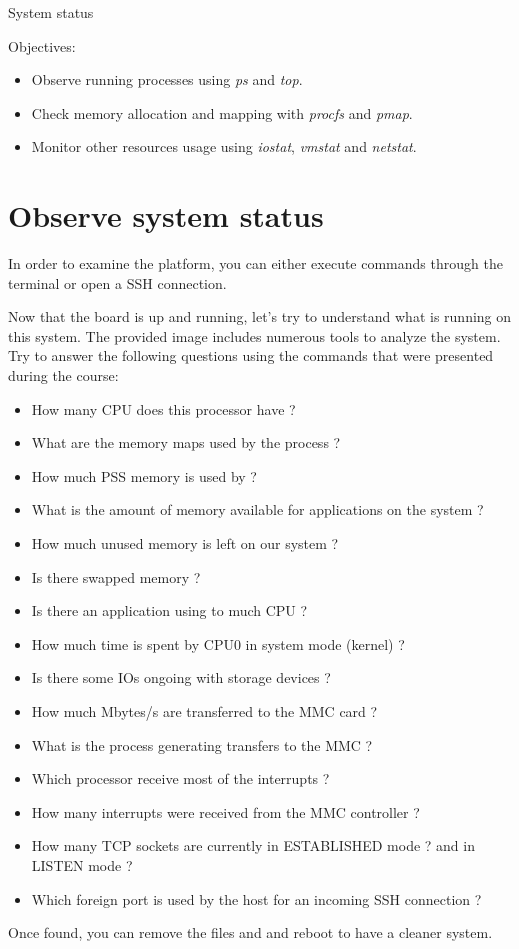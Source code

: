 \subchapter
{System status}
{Objectives:
  \begin{itemize}
    \item Observe running processes using {\em ps} and {\em top}.
    \item Check memory allocation and mapping with {\em procfs} and {\em pmap}.
    \item Monitor other resources usage using {\em iostat}, {\em vmstat} and {\em netstat}.
  \end{itemize}
}

\section{Observe system status}

In order to examine the platform, you can either execute commands through the
 terminal or open a SSH connection.

Now that the board is up and running, let's try to understand what is running
on this system. The provided image includes numerous tools to analyze the
system. Try to answer the following questions using the commands that were
presented during the course:

\begin{itemize}
  \item How many CPU does this processor have ?
  \item What are the memory maps used by the  process ?
  \item How much PSS memory is used by  ?
  \item What is the amount of memory available for applications on the system ?
  \item How much unused memory is left on our system ?
  \item Is there swapped memory ?
  \item Is there an application using to much CPU ?
  \item How much time is spent by CPU0 in system mode (kernel) ?
  \item Is there some IOs ongoing with storage devices ?
  \item How much Mbytes/s are transferred to the MMC card ?
  \item What is the process generating transfers to the MMC ?
  \item Which processor receive most of the interrupts ?
  \item How many interrupts were received from the MMC controller ?
  \item How many TCP sockets are currently in ESTABLISHED mode ? and in LISTEN
        mode ?
  \item Which foreign port is used by the host for an incoming SSH connection ?
\end{itemize}

Once found, you can remove the files  and
 and reboot to have a cleaner system.

